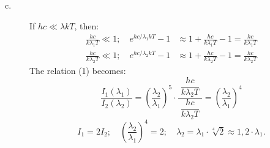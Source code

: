 \begin{description}
\item[c.] If $hc \ll \lambda k T$, then:
\begin{align*}
\frac{hc}{k\lambda_1 T} \ll 1;\quad
e^{hc/\lambda_1 k T} - 1 &\approx 1 + \frac{hc}{k\lambda_1 T} - 1
  = \frac{hc}{k\lambda_1 T}\\
\frac{hc}{k\lambda_2 T} \ll 1;\quad
e^{hc/\lambda_2 k T} - 1 &\approx 1 + \frac{hc}{k\lambda_2 T} - 1
  = \frac{hc}{k\lambda_2 T}
\end{align*}
The relation (1) becomes:
\[
\frac{I_1(\lambda_1)}{I_2(\lambda_2)}
  = \left( \frac{\lambda_2}{\lambda_1} \right)^{\!5}
    \cdot \frac{\;\dfrac{hc}{k\lambda_2 T}\;}{\dfrac{hc}{k\lambda_2 T}}
  = \left( \frac{\lambda_2}{\lambda_1} \right)^{\!4}
\]
\[
I_1 = 2 I_2;\quad
\left( \frac{\lambda_2}{\lambda_1} \right)^{\!4} = 2;\quad
\lambda_2 = \lambda_1 \cdot \sqrt[4]{2} \approx 1{,}2 \cdot \lambda_1.
\]
\end{description}

